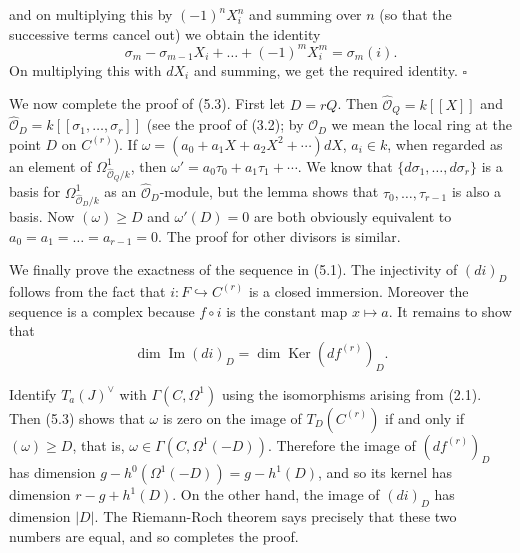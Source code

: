 

\DeclareMathOperator{\Ima}{Im}    %
\DeclareMathOperator{\Ker}{Ker}   %
\DeclareMathOperator{\Div}{Div}   %


and on multiplying this by $(-1)^n X_i^n$ and summing over $n$ (so that the
successive terms cancel out) we obtain the identity
\[
  \sigma_m - \sigma_{m-1} X_i + \dots + (-1)^m X_i^m = \sigma_m(i).
\]
On multiplying this with $dX_i$ and summing, we get the required identity.
\hfill $\square$

We now complete the proof of (5.3). First let $D = rQ$. Then
$\hat{\mathcal{O}}_Q = k[[X]]$ and
$\hat{\mathcal{O}}_D = k[[\sigma_1, \dots, \sigma_r]]$ (see the proof of
(3.2); by $\mathcal{O}_D$ we mean the local ring at the point $D$ on
$C^{(r)}$). If $\omega = (a_0 + a_1 X + a_2 X^2 + \cdots) dX$, $a_i \in k$,
when regarded as an element of $\Omega^1_{\hat{\mathcal{O}}_Q / k}$, then
$\omega' = a_0 \tau_0 + a_1 \tau_1 + \cdots$. We know that
$\{d\sigma_1, \dots, d\sigma_r\}$ is a basis for
$\Omega^1_{\hat{\mathcal{O}}_D / k}$ as an $\hat{\mathcal{O}}_D$-module, but
the lemma shows that $\tau_0, \dots, \tau_{r-1}$ is also a basis. Now
$(\omega) \ge D$ and $\omega'(D) = 0$ are both obviously equivalent to
$a_0 = a_1 = \dots = a_{r-1} = 0$. The proof for other divisors is similar.

We finally prove the exactness of the sequence in (5.1). The injectivity of
$(di)_D$ follows from the fact that $i \colon F \hookrightarrow C^{(r)}$ is a
closed immersion. Moreover the sequence is a complex because $f \circ i$ is
the constant map $x \mapsto a$. It remains to show that
\[
  \dim \Ima(di)_D = \dim \Ker(df^{(r)})_D.
\]

Identify $T_a(J)^{\vee}$ with $\Gamma(C, \Omega^1)$ using the isomorphisms
arising from (2.1). Then (5.3) shows that $\omega$ is zero on the image of
$T_D(C^{(r)})$ if and only if $(\omega) \ge D$, that is,
$\omega \in \Gamma(C, \Omega^1(-D))$. Therefore the image of $(df^{(r)})_D$
has dimension $g - h^0(\Omega^1(-D)) = g - h^1(D)$, and so its kernel has
dimension $r - g + h^1(D)$. On the other hand, the image of $(di)_D$ has
dimension $|D|$. %
The Riemann-Roch theorem says precisely that these two numbers are equal, and
so completes the proof.

